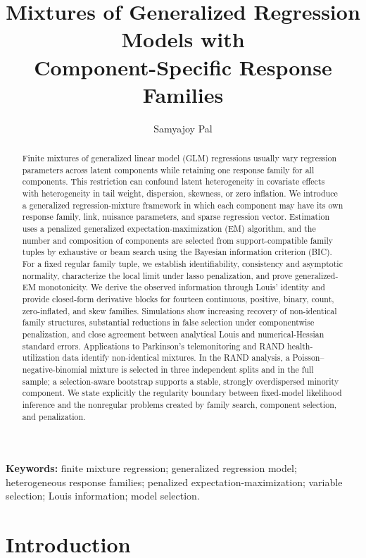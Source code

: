 \documentclass[11pt]{article}
\title{Mixtures of Generalized Regression Models with\\
Component-Specific Response Families}
\author{Samyajoy Pal}
\date{}
\begin{document}
\maketitle

\begin{abstract}
Finite mixtures of generalized linear model (GLM) regressions usually vary regression
parameters across latent components while retaining one response family for all
components.  This restriction can confound latent heterogeneity in covariate
effects with heterogeneity in tail weight, dispersion, skewness, or zero
inflation.  We introduce a generalized regression-mixture framework in which each component
may have its own response family, link, nuisance parameters, and sparse
regression vector.  Estimation uses a penalized generalized
expectation-maximization (EM) algorithm, and the number and composition of
components are selected from support-compatible family tuples by exhaustive or
beam search using the Bayesian information criterion (BIC).  For a fixed
regular family tuple, we establish identifiability, consistency and asymptotic
normality, characterize the local limit under lasso penalization, and prove
generalized-EM monotonicity.  We derive the observed information through Louis' identity and
provide closed-form derivative blocks for fourteen continuous, positive,
binary, count, zero-inflated, and skew families.  Simulations show increasing
recovery of non-identical family structures, substantial reductions in false
selection under componentwise penalization, and close agreement between
analytical Louis and numerical-Hessian standard errors.  Applications to
Parkinson's telemonitoring and RAND health-utilization data identify
non-identical mixtures.  In the RAND analysis, a Poisson--negative-binomial
mixture is selected in three independent splits and in the full sample; a
selection-aware bootstrap supports a stable, strongly overdispersed minority
component.  We state explicitly the regularity boundary between fixed-model
likelihood inference and the nonregular problems created by family search,
component selection, and penalization.
\end{abstract}

\noindent\textbf{Keywords:} finite mixture regression; generalized regression
model; heterogeneous response families; penalized expectation-maximization;
variable selection; Louis information; model selection.

\section{Introduction}
\label{sec:introduction}
\end{document}
